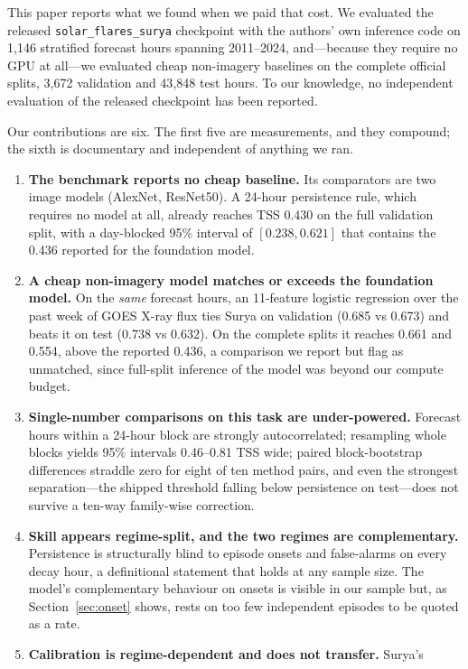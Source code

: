 \documentclass[11pt]{article}
\newcommand{\code}[1]{\texttt{#1}}
\begin{document}
This paper reports what we found when we paid that cost. We evaluated the
released \code{solar\_flares\_surya} checkpoint with the authors' own inference
code on 1{,}146 stratified forecast hours spanning 2011--2024, and---because they
require no GPU at all---we evaluated cheap non-imagery baselines on the complete
official splits, 3{,}672 validation and 43{,}848 test hours. To our knowledge,
no independent evaluation of the released checkpoint has been reported.

Our contributions are six. The first five are measurements, and they compound;
the sixth is documentary and independent of anything we ran.

\begin{enumerate}
\item \textbf{The benchmark reports no cheap baseline.} Its comparators are two
image models (AlexNet, ResNet50). A 24-hour persistence rule, which requires no
model at all, already reaches TSS 0.430 on the full validation split, with a
day-blocked 95\% interval of $[0.238, 0.621]$ that contains the 0.436 reported
for the foundation model.
\item \textbf{A cheap non-imagery model matches or exceeds the foundation
model.} On the \emph{same} forecast hours, an 11-feature logistic regression over
the past week of GOES X-ray flux ties Surya on validation (0.685 vs 0.673) and
beats it on test (0.738 vs 0.632). On the complete splits it reaches 0.661 and
0.554, above the reported 0.436, a comparison we report but flag as unmatched,
since full-split inference of the model was beyond our compute budget.
\item \textbf{Single-number comparisons on this task are under-powered.}
Forecast hours within a 24-hour block are strongly autocorrelated; resampling
whole blocks yields 95\% intervals 0.46--0.81 TSS wide; paired block-bootstrap differences
straddle zero for eight of ten method pairs, and even the strongest
separation---the shipped threshold falling below persistence on test---does
not survive a ten-way family-wise correction.
\item \textbf{Skill appears regime-split, and the two regimes are
complementary.} Persistence is structurally blind to episode onsets and
false-alarms on every decay hour, a definitional statement that holds at any
sample size. The model's complementary behaviour on onsets is visible in our
sample but, as Section~\ref{sec:onset} shows, rests on too few independent
episodes to be quoted as a rate.
\item \textbf{Calibration is regime-dependent and does not transfer.} Surya's

\end{enumerate}
\end{document}
